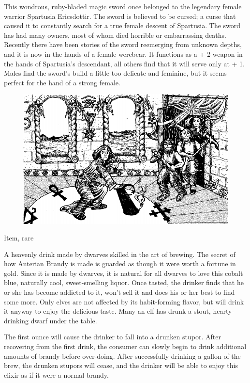 \documentclass[palace_of_the_silver_princess]{subfiles}
\begin{document}
This wondrous, ruby-bladed magic sword once belonged to the legendary
female warrior Spartusia Ericsdottir. The sword is believed to be
cursed; a curse that caused it to constantly search for a true female
descent of Spartusia. The sword has had many owners, most of whom died
horrible or embarrassing deaths. Recently there have been stories of
the sword reemerging from unknown depths, and it is now in the hands of
a female werebear. It functions as a + 2 weapon in the hands of
Spartusia’s descendant, all others find that it will serve only at + 1.
Males find the sword’s build a little too delicate and feminine, but it
seems perfect for the hand of a strong female.

\begin{figure}[!ht]
    \includegraphics[width=\textwidth]{img/cleric.png}
\end{figure}

{Item, rare}

A heavenly drink made by dwarves skilled in the art of brewing. The
secret of how Anterian Brandy is made is guarded as though it were worth
a fortune in gold. Since it is made by dwarves, it is natural for all
dwarves to love this cobalt blue, naturally cool, sweet-smelling liquor.
Once tasted, the drinker finds that he or she has become addicted to it,
won’t sell it and does his or her best to find some more. Only elves are
not affected by its habit-forming flavor, but will drink it anyway to
enjoy the delicious taste. Many an elf has drunk a stout,
hearty-drinking dwarf under the table.

The first ounce will cause the drinker to fall into a drunken stupor.
After recovering from the first drink, the consumer can slowly begin to
drink additional amounts of brandy before over-doing. After
successfully drinking a gallon of the brew, the drunken stupors will
cease, and the drinker will be able to enjoy this elixir as if it were a
normal brandy.
\end{document}
